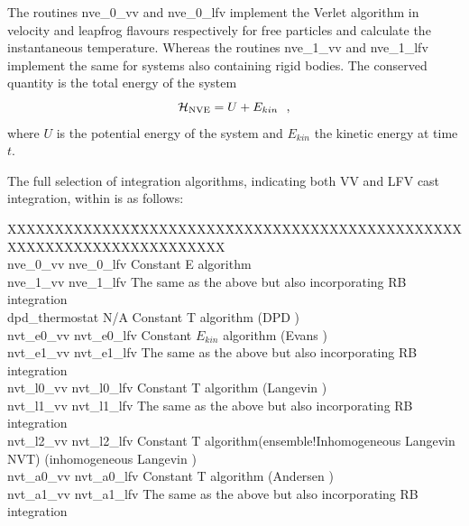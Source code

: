 The routines {\sc nve\_0\_vv} and {\sc nve\_0\_lfv} implement the
Verlet algorithm in velocity and leapfrog
flavours respectively for free particles and calculate the
instantaneous temperature.  Whereas the routines {\sc nve\_1\_vv} and
{\sc nve\_1\_lfv} implement the same for systems also containing
rigid bodies.  The conserved quantity is the total energy of the system
\begin{equation}
{\cal H}_{\rm NVE} = U + E_{kin}~~,
\end{equation}
where $U$ is the potential energy of the system and $E_{kin}$ the
kinetic energy at time $t$.

The full selection of integration algorithms, indicating both VV and
LFV cast integration, within \D is as follows:

\begin{tabbing}
XXXXXXXXXXXXX\=XXXXXXXXXX\=XXXXXXXXXXXXXXXXXXXXXXXXXXXXXXXXXXXXXXXXXXXXXXXX\kill\\
{\sc nve\_0\_vv}      \> {\sc nve\_0\_lfv}  \> Constant E algorithm \\
{\sc nve\_1\_vv}      \> {\sc nve\_1\_lfv}  \> The same as the above but also incorporating RB integration \\
{\sc dpd\_thermostat} \> N/A            \> Constant T algorithm (DPD \cite{shardlow-03a}) \\
{\sc nvt\_e0\_vv}     \> {\sc nvt\_e0\_lfv} \> Constant $E_{kin}$ algorithm (Evans \cite{evans-84a}) \\
{\sc nvt\_e1\_vv}     \> {\sc nvt\_e1\_lfv} \> The same as the above but also incorporating RB integration \\
{\sc nvt\_l0\_vv}     \> {\sc nvt\_l0\_lfv} \> Constant T algorithm (Langevin \cite{adelman-76a}) \\
{\sc nvt\_l1\_vv}     \> {\sc nvt\_l1\_lfv} \> The same as the above but also incorporating RB integration \\
{\sc nvt\_l2\_vv}     \> {\sc nvt\_l2\_lfv} \> Constant T algorithm\index(ensemble!Inhomogeneous Langevin NVT) (inhomogeneous Langevin \cite{duffy-07a}) \\
{\sc nvt\_a0\_vv}     \> {\sc nvt\_a0\_lfv} \> Constant T algorithm (Andersen \cite{andersen-79a}) \\
{\sc nvt\_a1\_vv}     \> {\sc nvt\_a1\_lfv} \> The same as the above but also incorporating RB integration \\

\end{tabbing}
